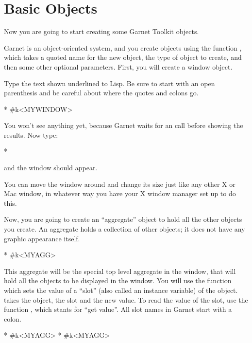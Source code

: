 \section{Basic Objects}
Now you are going to start creating some Garnet Toolkit objects.

Garnet is an object-oriented system, and you create objects using the
function , which takes a quoted name for the new
object, the type of object to create, and then some other optional
parameters.  First, you will create a window object.

Type the text shown underlined to Lisp.  Be sure to start with an open
parenthesis and be careful about where the quotes and colons go.
\begin{programexample}
* 
\#k<MYWINDOW>
\end{programexample}

You won't see anything yet, because Garnet waits for an  call
before showing the results.  Now type:
\begin{programexample}
* 
\end{programexample}
and the window should appear.

You can move the window around and change its size just like any other
X or Mac window, in whatever way you have your X window manager set up
to do this.

Now, you are going to create an ``aggregate'' object to hold all the other
objects you create.  An aggregate holds a collection of other objects; it
does not have any graphic appearance itself.
\begin{programexample}
* 
\#k<MYAGG>
\end{programexample}
This aggregate will be the special top level aggregate in the window, that
will hold all the objects to be displayed in the window.  You will use the
function  which sets the value of a ``slot'' (also called an
instance variable) of the object.   takes the object, the slot
and the new value.  To read the value of the slot, use the function ,
which stants for ``get value''.  All slot names in Garnet start
with a colon.
\begin{programexample}
* 
\#k<MYAGG>
* 
\#k<MYAGG>
\end{programexample}

